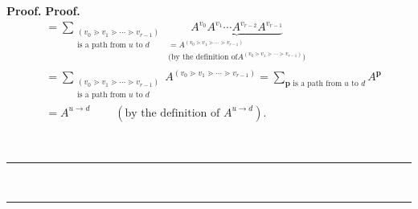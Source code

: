 \documentclass[numbers=enddot,12pt,final,onecolumn,notitlepage]{scrartcl}%
\theoremstyle{definition}
\newenvironment{vershort}{}{}
\newcommand{\downslack}{A}
\newenvironment{proof}[1][Proof]{\noindent\textbf{#1.} }{\ \rule{0.5em}{0.5em}}
\let\sumnonlimits\sum
\renewcommand{\sum}{\sumnonlimits\limits}
\begin{document}
\begin{proof}
\begin{proof}
\begin{vershort}
\begin{align*}
&  =\sum_{\substack{\left(  v_{0}\gtrdot v_{1}\gtrdot\cdots\gtrdot
v_{r-1}\right)  \\\text{is a path from }u\text{ to }d}%
}\underbrace{\downslack^{v_{0}}\downslack^{v_{1}}\cdots\downslack^{v_{r-2}%
}\downslack^{v_{r-1}}}_{\substack{=\downslack^{\left(  v_{0}\gtrdot
v_{1}\gtrdot\cdots\gtrdot v_{r-1}\right)  }\\\text{(by the definition of
}\downslack^{\left(  v_{0}\gtrdot v_{1}\gtrdot\cdots\gtrdot v_{r-1}\right)
}\text{)}}}\\
&  =\sum_{\substack{\left(  v_{0}\gtrdot v_{1}\gtrdot\cdots\gtrdot
v_{r-1}\right)  \\\text{is a path from }u\text{ to }d}}\downslack^{\left(
v_{0}\gtrdot v_{1}\gtrdot\cdots\gtrdot v_{r-1}\right)  }=\sum_{\mathbf{p}%
\text{ is a path from }u\text{ to }d}\downslack^{\mathbf{p}}\\
&  =\downslack^{u\rightarrow d}\ \ \ \ \ \ \ \ \ \ \left(  \text{by the
definition of }\downslack^{u\rightarrow d}\right)  .
\end{align*}

\end{vershort}


\end{proof}
\end{proof}
\end{document}
